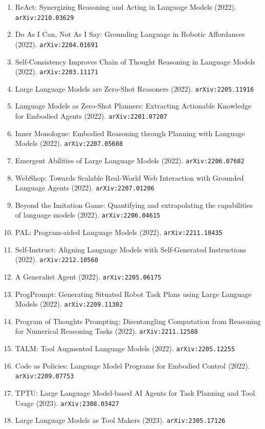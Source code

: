 \documentclass[11pt]{article}
\begin{document}
\begin{enumerate}
  \item ReAct: Synergizing Reasoning and Acting in Language Models (2022). \texttt{arXiv:2210.03629}
  \item Do As I Can, Not As I Say: Grounding Language in Robotic Affordances (2022). \texttt{arXiv:2204.01691}
  \item Self-Consistency Improves Chain of Thought Reasoning in Language Models (2022). \texttt{arXiv:2203.11171}
  \item Large Language Models are Zero-Shot Reasoners (2022). \texttt{arXiv:2205.11916}
  \item Language Models as Zero-Shot Planners: Extracting Actionable Knowledge
  for Embodied Agents (2022). \texttt{arXiv:2201.07207}
  \item Inner Monologue: Embodied Reasoning through Planning with Language
  Models (2022). \texttt{arXiv:2207.05608}
  \item Emergent Abilities of Large Language Models (2022). \texttt{arXiv:2206.07682}
  \item WebShop: Towards Scalable Real-World Web Interaction with Grounded
  Language Agents (2022). \texttt{arXiv:2207.01206}
  \item Beyond the Imitation Game: Quantifying and extrapolating the
  capabilities of language models (2022). \texttt{arXiv:2206.04615}
  \item PAL: Program-aided Language Models (2022). \texttt{arXiv:2211.10435}
  \item Self-Instruct: Aligning Language Models with Self-Generated Instructions (2022). \texttt{arXiv:2212.10560}
  \item A Generalist Agent (2022). \texttt{arXiv:2205.06175}
  \item ProgPrompt: Generating Situated Robot Task Plans using Large Language
  Models (2022). \texttt{arXiv:2209.11302}
  \item Program of Thoughts Prompting: Disentangling Computation from Reasoning
  for Numerical Reasoning Tasks (2022). \texttt{arXiv:2211.12588}
  \item TALM: Tool Augmented Language Models (2022). \texttt{arXiv:2205.12255}
  \item Code as Policies: Language Model Programs for Embodied Control (2022). \texttt{arXiv:2209.07753}
  \item TPTU: Large Language Model-based AI Agents for Task Planning and Tool Usage (2023). \texttt{arXiv:2308.03427}
  \item Large Language Models as Tool Makers (2023). \texttt{arXiv:2305.17126}

\end{enumerate}
\end{document}

